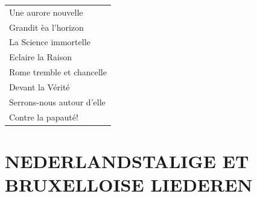 \documentclass[a4paper, 14pt]{extarticle}
\begin{document}
\begin{flushleft}
\begin{tabularx}{0.7\textwidth} {
   >{\raggedright\arraybackslash}X }
Une aurore nouvelle\\
Grandit èa l’horizon\\
La Science immortelle\\
Eclaire la Raison\\
Rome tremble et chancelle\\
Devant la Vérité\\
Serrons-nous autour d’elle\\
Contre la papauté!\\
\end{tabularx}
\end{flushleft}
\newpage
\section*{NEDERLANDSTALIGE ET\\ BRUXELLOISE LIEDEREN}
\end{document}
